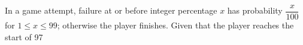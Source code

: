 In a game attempt, failure at or before integer percentage $x$ has probability $\dfrac{x}{100}$ for $1\le x\le99$; otherwise the player finishes. Given that the player reaches the start of 97%

